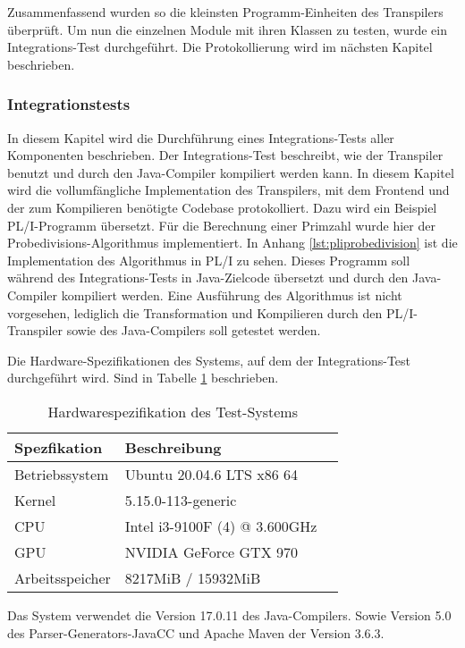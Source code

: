 Zusammenfassend wurden so die kleinsten Programm-Einheiten des Transpilers überprüft. Um nun die einzelnen Module mit ihren Klassen zu testen, wurde ein Integrations-Test durchgeführt. Die Protokollierung wird im nächsten Kapitel beschrieben.

\pagebreak
\subsubsection{Integrationstests}
In diesem Kapitel wird die Durchführung eines Integrations-Tests aller Komponenten beschrieben. Der Integrations-Test beschreibt, wie der Transpiler benutzt und durch den Java-Compiler kompiliert werden kann.
In diesem Kapitel wird die vollumfängliche Implementation des Transpilers, mit dem Frontend und der zum Kompilieren benötigte Codebase protokolliert. Dazu wird ein Beispiel PL/I-Programm übersetzt. Für die Berechnung einer Primzahl wurde hier der Probedivisions-Algorithmus implementiert. In Anhang \ref{lst:pliprobedivision} ist die Implementation des Algorithmus in PL/I zu sehen. Dieses Programm soll während des Integrations-Tests in Java-Zielcode übersetzt und durch den Java-Compiler kompiliert werden.
Eine Ausführung des Algorithmus ist nicht vorgesehen, lediglich die Transformation und Kompilieren durch den PL/I-Transpiler sowie des Java-Compilers
soll getestet werden.

Die Hardware-Spezifikationen des Systems, auf dem der Integrations-Test durchgeführt wird. Sind in Tabelle \ref{tab:hardwartable} beschrieben.

\begin{table}[h]\label{tab:hardwartable}
	\centering
	\begin{tabular}[h]{|l|l|l|}
		\hline
		\textbf{Spezfikation} & \textbf{Beschreibung}  \\
		\hline
		Betriebssystem & Ubuntu 20.04.6 LTS x86 64 \\
		\hline
		Kernel & 5.15.0-113-generic  \\
		\hline
		CPU & Intel i3-9100F (4) @ 3.600GHz \\
		\hline
		GPU & NVIDIA GeForce GTX 970  \\
		\hline
		Arbeitsspeicher & 8217MiB / 15932MiB \\
		\hline
		
	\end{tabular}
	\caption{Hardwarespezifikation des Test-Systems}
\end{table}

Das System verwendet die Version 17.0.11 des Java-Compilers. Sowie Version 5.0 des Parser-Generators-JavaCC und Apache Maven der Version 3.6.3.

